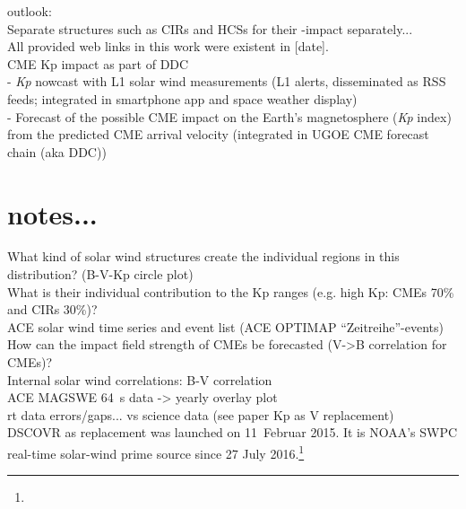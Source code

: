 outlook:\\
Separate structures such as CIRs and HCSs for their \Kp-impact separately...\\

All provided web links in this work were existent in [date].\\


CME Kp impact as part of DDC\\
- \textit{Kp} nowcast with L1 solar wind measurements (L1 alerts, disseminated as RSS feeds; integrated in smartphone app and space weather display)\\
- Forecast of the possible CME impact on the Earth's magnetosphere (\textit{Kp} index) from the predicted CME arrival velocity (integrated in UGOE CME forecast chain (aka DDC))\\


\section{notes...}

What kind of solar wind structures create the individual regions in this distribution? (B-V-Kp circle plot)\\
What is their individual contribution to the Kp ranges (e.g. high Kp: CMEs 70\% and CIRs 30\%)?\\

ACE solar wind time series and event list (ACE OPTIMAP ``Zeitreihe''-events)\\


How can the impact field strength of CMEs be forecasted (V->B correlation for CMEs)?\\
Internal solar wind correlations: B-V correlation\\
ACE MAGSWE 64~s data -> yearly overlay plot\\


rt data errors/gaps... vs science data (see paper Kp as V replacement)\\
DSCOVR as replacement was launched on 11~Februar 2015. It is NOAA's SWPC real-time solar-wind prime source since 27 July 2016.\footnote{}\\


